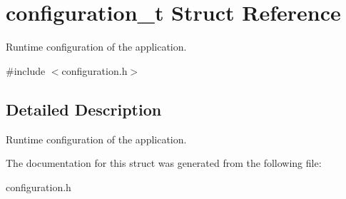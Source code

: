 \hypertarget{structconfiguration__t}{\section{configuration\-\_\-t \-Struct \-Reference}
\label{structconfiguration__t}
}


\-Runtime configuration of the application.  




{\ttfamily \#include $<$configuration.\-h$>$}



\subsection{\-Detailed \-Description}
\-Runtime configuration of the application. 

\-The documentation for this struct was generated from the following file\-:\begin{DoxyCompactItemize}
\item 
configuration.\-h\end{DoxyCompactItemize}
